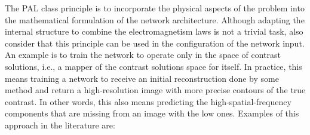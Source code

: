 		The PAL class principle is to incorporate the physical aspects of the problem into the mathematical formulation of the network architecture. Although adapting the internal structure to combine the electromagnetism laws is not a trivial task, \cite{chen2020review} also consider that this principle can be used in the configuration of the network input. An example is to train the network to operate only in the space of contrast solutions, i.e., a mapper of the contrast solutions space for itself. In practice, this means training a network to receive an initial reconstruction done by some method and return a high-resolution image with more precise contours of the true contrast. In other words, this also means predicting the high-spatial-frequency components that are missing from an image with the low ones. Examples of this approach in the literature are:
